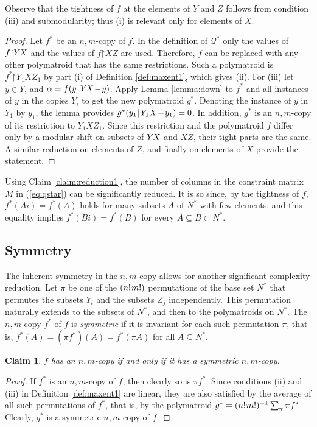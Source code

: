 \documentclass[reqno]{amsart}
\newtheorem{claim}[theorem]{Claim}
\theoremstyle{definition}
\newcommand\tsp{\mkern 1.5mu}
\def\|{\mkern1.5mu{|}\mkern1.5mu}
\def\restr{\mathord\upharpoonright}
\def\sm{\tsp{-}\tsp} %
\def\YX{Y\mkern-2mu X}
\begin{document}
Observe that the tightness of $f$ at the elements of $Y$ and $Z$ follows
from condition (iii) and submodularity; thus (i) is relevant only for
elements of $X$.

\begin{proof}
Let $f^*$ be an $n,m$-copy of $f$. In the definition of $\mathcal Q^*$
only the values of $f\restr \YX$ and the values of $f\restr XZ$ are
used. Therefore, $f$ can be replaced with any other polymatroid that
has the same restrictions. Such a polymatroid is $f^*\restr Y_1XZ_1$
by part (i) of Definition \ref{def:maxent1}, which gives (ii). For (iii)
let $y\in Y$, and $\alpha=f(y\|\YX\sm y)$. Apply Lemma \ref{lemma:down}
to $f^*$ and all instances of $y$ in the copies $Y_i$ to get the new
polymatroid $g^*$. Denoting the instance of $y$ in $Y_1$ by $y_1$,
the lemma provides $g^*(y_1\|Y_1X\sm y_1)=0$. In addition, $g^*$ is an
$n,m$-copy of its restriction to $Y_1XZ_1$. Since this restriction
and the polymatroid $f$ differ only by a modular shift on subsets of
$\YX$ and $XZ$, their tight parts are the same. A similar reduction on
elements of $Z$, and finally on elements of $X$ provide the statement.
\end{proof}

Using Claim \ref{claim:reduction1}, the number of columns in the constraint
matrix $M$ in (\ref{eq:qstar}) can be significantly reduced. It is so since,
by the tightness of $f$, $f^*(Ai)=f^*(A)$ holds for many subsets $A$ of
$N^*$ with few elements, and this equality implies $f^*(Bi)= f^*(B)$ for
every $A\subseteq B\subset N^*$.

\subsection{Symmetry}

The inherent symmetry in the $n,m$-copy allows for another significant
complexity reduction. Let $\pi$ be one of the $(n!\tsp m!)$ permutations of
the base set $N^*$ that permutes the subsets $Y_i$ and the subsets $Z_j$
independently. This permutation naturally extends to the subsets of $N^*$,
and then to the polymatroids on $N^*$. The $n,m$-copy $f^*$ of $f$ is
\emph{symmetric} if it is invariant for each such permutation $\pi$, that
is, $f^*(A)=(\pi f^*)(A) = f^*(\pi A)$ for all $A\subseteq N^*$.

\begin{claim}\label{claim:reduction2}
$f$ has an $n,m$-copy if and only if it has a symmetric $n,m$-copy.
\end{claim}
\begin{proof}

If $f^*$ is an $n,m$-copy of $f$, then clearly so is $\pi f^*$. Since
conditions (ii) and (iii) in Definition \ref{def:maxent1} are linear,
they are also satisfied by the average of all such permutations of $f^*$,
that is, by the polymatroid $g^*=(n!\tsp m!)^{-1}\sum_\pi \pi f^*$.
Clearly, $g^*$ is a symmetric $n,m$-copy of $f$.
\end{proof}
\end{document}
